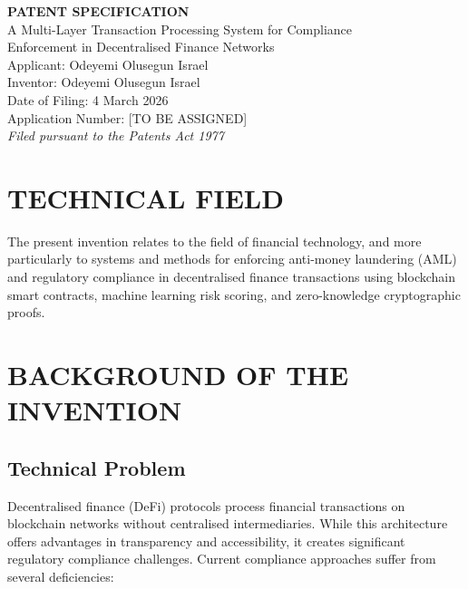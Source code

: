 \documentclass[12pt,a4paper]{article}
\begin{document}
\begin{center}
{\LARGE\bfseries PATENT SPECIFICATION}\\[1em]
{\Large A Multi-Layer Transaction Processing System for Compliance\\
Enforcement in Decentralised Finance Networks}\\[2em]
{\large Applicant: Odeyemi Olusegun Israel}\\[0.5em]
{\large Inventor: Odeyemi Olusegun Israel}\\[0.5em]
{\large Date of Filing: 4 March 2026}\\[0.5em]
{\large Application Number: [TO BE ASSIGNED]}\\[0.3em]
{\normalsize \textit{Filed pursuant to the Patents Act 1977}}
\end{center}

\vspace{2em}

\section{TECHNICAL FIELD}

The present invention relates to the field of financial technology, and more 
particularly to systems and methods for enforcing anti-money laundering (AML) 
and regulatory compliance in decentralised finance transactions using 
blockchain smart contracts, machine learning risk scoring, and 
zero-knowledge cryptographic proofs.

\section{BACKGROUND OF THE INVENTION}

\subsection{Technical Problem}

Decentralised finance (DeFi) protocols process financial transactions on 
blockchain networks without centralised intermediaries. While this 
architecture offers advantages in transparency and accessibility, it creates 
significant regulatory compliance challenges. Current compliance approaches 
suffer from several deficiencies:
\end{document}

